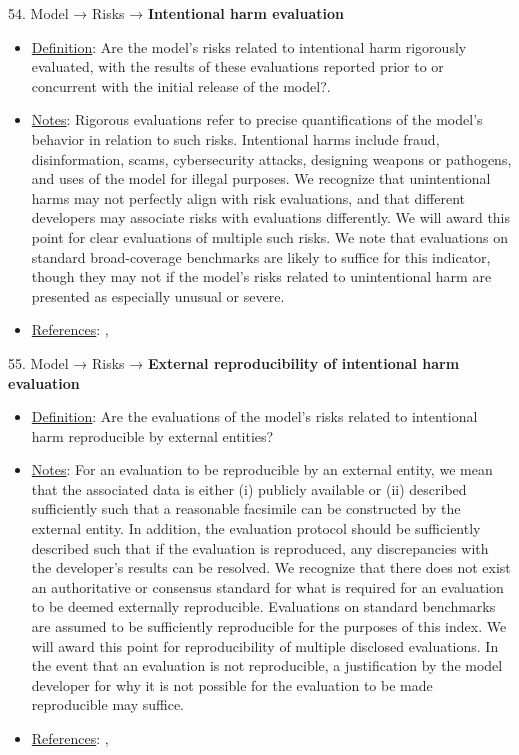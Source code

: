 54. Model → Risks → \textbf{Intentional harm evaluation}
\vspace{-\parskip}
\begin{itemize}
\item
\underline{Definition}: Are the model’s risks related to intentional harm rigorously evaluated, with the results of these evaluations reported prior to or concurrent with the initial release of the model?.
\item
\underline{Notes}: Rigorous evaluations refer to precise quantifications of the model's behavior in relation to such risks. Intentional harms include fraud, disinformation, scams, cybersecurity attacks, designing weapons or pathogens, and uses of the model for illegal purposes. We recognize that unintentional harms may not perfectly align with risk evaluations, and that different developers may associate risks with evaluations differently. We will award this point for clear evaluations of multiple such risks. We note that evaluations on standard broad-coverage benchmarks are likely to suffice for this indicator, though they may not if the model's risks related to unintentional harm are presented as especially unusual or severe.
\item
\underline{References}: \citet{solaiman2023evaluating}, \citet{weidinger2021ethical}
\end{itemize}


55. Model → Risks → \textbf{External reproducibility of intentional harm evaluation}
\vspace{-\parskip}
\begin{itemize}
\item
\underline{Definition}: Are the evaluations of the model’s risks related to intentional harm reproducible by external entities?
\item
\underline{Notes}: For an evaluation to be reproducible by an external entity, we mean that the associated data is either (i) publicly available or (ii) described sufficiently such that a reasonable facsimile can be constructed by the external entity. In addition, the evaluation protocol should be sufficiently described such that if the evaluation is reproduced, any discrepancies with the developer's results can be resolved. We recognize that there does not exist an authoritative or consensus standard for what is required for an evaluation to be deemed externally reproducible. Evaluations on standard benchmarks are assumed to be sufficiently reproducible for the purposes of this index. We will award this point for reproducibility of multiple disclosed evaluations. In the event that an evaluation is not reproducible, a justification by the model developer for why it is not possible for the evaluation to be made reproducible may suffice.
\item
\underline{References}: \citet{kapoor2023leakage}, \citet{weidinger2021ethical}
\end{itemize}


